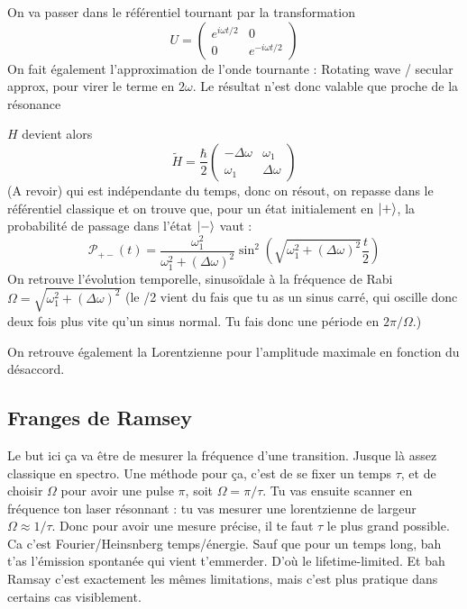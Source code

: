 \documentclass[a4paper]{report}
\begin{document}
   On va passer dans le référentiel tournant par la transformation \begin{equation}
   U=\begin{pmatrix} e^{i\omega t/2} & 0 \\ 0 & e^{-i\omega t/2}  \end{pmatrix}
   \end{equation}On fait également l'approximation de l'onde tournante : Rotating wave / secular approx, pour virer le terme en $2\omega$. Le résultat n'est donc valable que proche de la résonance 
   
   $H$ devient alors \begin{equation}
   \tilde{H}=\dfrac{\hbar}{2} \begin{pmatrix} -\Delta\omega & \omega_1  \\ \omega_1 & \Delta\omega  \end{pmatrix}
   \end{equation} (A revoir) qui est indépendante du temps, donc on résout, on repasse dans le référentiel classique et on trouve que, pour un état initialement en $\ket{+}$, la probabilité de passage dans l'état $\ket{-}$ vaut : \begin{equation}
   \mathcal{P}_{+-}(t)=\dfrac{\omega_1^2}{\omega_1^2+(\Delta\omega)^2}\sin^2(\sqrt{\omega_1^2+(\Delta\omega)^2}\dfrac{t}{2})
   \end{equation}
   On retrouve l'évolution temporelle, sinusoïdale à la fréquence de Rabi $\Omega=\sqrt{\omega_1^2+(\Delta\omega)^2}$ (le /2 vient du fais que tu as un sinus carré, qui oscille donc deux fois plus vite qu'un sinus normal. Tu fais donc une période en $2\pi/\Omega$.)
   
   On retrouve également la Lorentzienne pour l'amplitude maximale en fonction du désaccord.
   
   \subsection{Franges de Ramsey}
   Le but ici ça va être de mesurer la fréquence d'une transition. Jusque là assez classique en spectro. Une méthode pour ça, c'est de se fixer un temps $\tau$, et de choisir $\Omega$ pour avoir une pulse $\pi$, soit $\Omega=\pi/\tau$. Tu vas ensuite scanner en fréquence ton laser résonnant : tu vas mesurer une lorentzienne de largeur $\Omega \approx 1/\tau$. Donc pour avoir une mesure précise, il te faut $\tau$ le plus grand possible. Ca c'est Fourier/Heinsnberg temps/énergie. Sauf que pour un temps long, bah t'as l'émission spontanée qui vient t'emmerder. D'où le lifetime-limited. Et bah Ramsay c'est exactement les mêmes limitations, mais c'est plus pratique dans certains cas visiblement.
   
\end{document}
